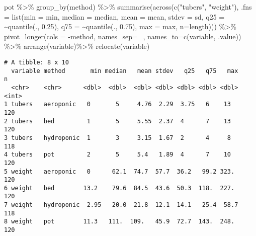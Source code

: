 \documentclass[
  letterpaper,
  DIV=11,
  numbers=noendperiod]{scrartcl}
\newenvironment{Shaded}{\begin{snugshade}}{\end{snugshade}}
\newcommand{\AttributeTok}[1]{\textcolor[rgb]{0.40,0.45,0.13}{#1}}
\newcommand{\FloatTok}[1]{\textcolor[rgb]{0.68,0.00,0.00}{#1}}
\newcommand{\FunctionTok}[1]{\textcolor[rgb]{0.28,0.35,0.67}{#1}}
\newcommand{\NormalTok}[1]{\textcolor[rgb]{0.00,0.23,0.31}{#1}}
\newcommand{\SpecialCharTok}[1]{\textcolor[rgb]{0.37,0.37,0.37}{#1}}
\newcommand{\StringTok}[1]{\textcolor[rgb]{0.13,0.47,0.30}{#1}}
\begin{document}
\begin{Shaded}
\begin{Highlighting}[]
\NormalTok{pot }\SpecialCharTok{\%\textgreater{}\%}  \FunctionTok{group\_by}\NormalTok{(method) }\SpecialCharTok{\%\textgreater{}\%}
  \FunctionTok{summarise}\NormalTok{(}\FunctionTok{across}\NormalTok{(}\FunctionTok{c}\NormalTok{(}\StringTok{"tubers"}\NormalTok{, }\StringTok{"weight"}\NormalTok{), }\AttributeTok{.fns =} 
                     \FunctionTok{list}\NormalTok{(}\AttributeTok{min =}\NormalTok{ min,}
                          \AttributeTok{median =}\NormalTok{ median,}
                          \AttributeTok{mean =}\NormalTok{ mean,}
                          \AttributeTok{stdev =}\NormalTok{ sd,}
                          \AttributeTok{q25 =} \SpecialCharTok{\textasciitilde{}}\FunctionTok{quantile}\NormalTok{(., }\FloatTok{0.25}\NormalTok{),}
                          \AttributeTok{q75 =} \SpecialCharTok{\textasciitilde{}}\FunctionTok{quantile}\NormalTok{(., }\FloatTok{0.75}\NormalTok{),}
                          \AttributeTok{max =}\NormalTok{ max, }
                          \AttributeTok{n=}\NormalTok{length))) }\SpecialCharTok{\%\textgreater{}\%}
  \FunctionTok{pivot\_longer}\NormalTok{(}\AttributeTok{cols =} \SpecialCharTok{{-}}\NormalTok{method,  }\AttributeTok{names\_sep=}\StringTok{\textquotesingle{}\_\textquotesingle{}}\NormalTok{, }\AttributeTok{names\_to=}\FunctionTok{c}\NormalTok{(}\StringTok{\textquotesingle{}variable\textquotesingle{}}\NormalTok{, }\StringTok{\textquotesingle{}.value\textquotesingle{}}\NormalTok{)) }\SpecialCharTok{\%\textgreater{}\%} 
  \FunctionTok{arrange}\NormalTok{(variable)}\SpecialCharTok{\%\textgreater{}\%} 
  \FunctionTok{relocate}\NormalTok{(variable)}
\end{Highlighting}
\end{Shaded}

\begin{verbatim}
# A tibble: 8 x 10
  variable method       min median   mean stdev   q25   q75   max     n
  <chr>    <chr>      <dbl>  <dbl>  <dbl> <dbl> <dbl> <dbl> <dbl> <int>
1 tubers   aeroponic   0       5     4.76  2.29  3.75   6    13     120
2 tubers   bed         1       5     5.55  2.37  4      7    13     120
3 tubers   hydroponic  1       3     3.15  1.67  2      4     8     118
4 tubers   pot         2       5     5.4   1.89  4      7    10     120
5 weight   aeroponic   0      62.1  74.7  57.7  36.2   99.2 323.    120
6 weight   bed        13.2    79.6  84.5  43.6  50.3  118.  227.    120
7 weight   hydroponic  2.95   20.0  21.8  12.1  14.1   25.4  58.7   118
8 weight   pot        11.3   111.  109.   45.9  72.7  143.  248.    120
\end{verbatim}
\end{document}
